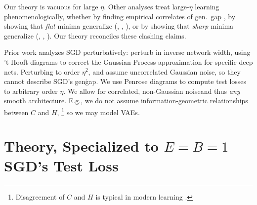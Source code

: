 \documentclass{article}
\theoremstyle{plain}
\theoremstyle{definition}
\begin{document}

    Our theory is vacuous for large $\eta$.  Other analyses treat
    large-$\eta$ learning phenomenologically, whether by finding empirical
    correlates of gen.\ gap \citep{li18}, by showing that \emph{flat} minima
    generalize (\cite{ho17}, \cite{ke17}, \cite{wa18}), or by showing that
    \emph{sharp} minima generalize (\cite{st56}, \cite{di17}, \cite{wu18}).
    Our theory reconciles these clashing claims.
    

    Prior work analyzes SGD perturbatively: \cite{dy19} perturb in inverse
    network width, using 't Hooft diagrams to correct the Gaussian Process
    approximation for specific deep nets.  Perturbing to order $\eta^2$,
    \cite{ch18} and \cite{li17} assume uncorrelated Gaussian noise, so they
    cannot describe SGD's gen\. gap.  We use Penrose diagrams to compute test
    losses to arbitrary order $\eta$.  We allow for correlated, non-Gaussian
    noiseand thus \emph{any} smooth architecture.  E.g., we do not assume
    information-geometric relationships between $C$ and
    $H$,
    \footnote{
        Disagreement of $C$ and $H$ is typical in modern learning \citep{ro12,
        ku19}.
    }
    so we may model VAEs. 


\section{Theory, Specialized to $E=B=1$ SGD's Test Loss} \label{sect:calculus}
\end{document}
